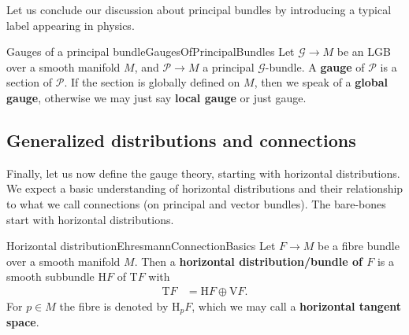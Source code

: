 \documentclass[reqno,a4paper,oneside]{amsart}
\theoremstyle{plain}
\theoremstyle{remark}
\theoremstyle{definition}
\begin{document}
Let us conclude our discussion about principal bundles by introducing a typical label appearing in physics.

\begin{definitions}{Gauges of a principal bundle}{GaugesOfPrincipalBundles}
Let $\mathcal{G} \to M$ be an LGB over a smooth manifold $M$, and $\mathcal{P} \to M$ a principal $\mathcal{G}$-bundle. A \textbf{gauge} of $\mathcal{P}$ is a section of $\mathcal{P}$. If the section is globally defined on $M$, then we speak of a \textbf{global gauge}, otherwise we may just say \textbf{local gauge} or just gauge.
\end{definitions}
%

\subsection{Generalized distributions and connections}\label{ConnectionSubsection}

Finally, let us now define the gauge theory, starting with horizontal distributions. 
We expect a basic understanding of horizontal distributions and their relationship to what we call connections (on principal and vector bundles). The bare-bones start with horizontal distributions.

\begin{definitions}{Horizontal distribution}{EhresmannConnectionBasics}
Let $F \to M$ be a fibre bundle over a smooth manifold $M$. Then a \textbf{horizontal distribution/bundle of $F$} is a smooth subbundle $\mathrm{H}F$ of $\mathrm{T}F$ with
\begin{align*}
\mathrm{T}F
&=
\mathrm{H}F \oplus \mathrm{V}F.
\end{align*}
For $p \in M$ the fibre is denoted by $\mathrm{H}_p F$, which we may call a \textbf{horizontal tangent space}.
\end{definitions}
\end{document}
